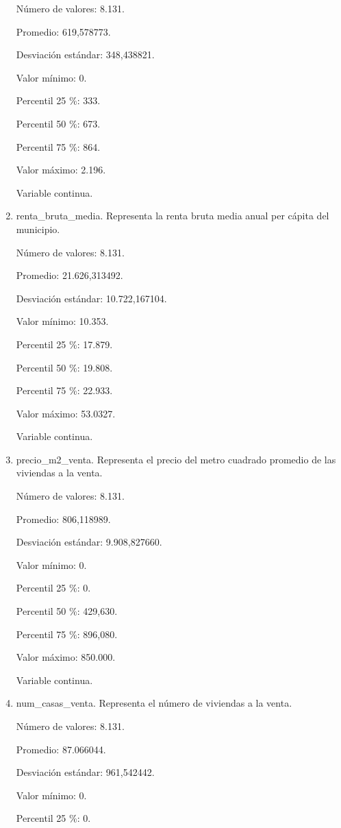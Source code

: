 \begin{enumerate}
	Número de valores: 8.131.
	
	Promedio: 619,578773.
	
	Desviación estándar: 348,438821.
	
	Valor mínimo: 0.
	
	Percentil 25 \%: 333.
	
	Percentil 50 \%: 673.
	
	Percentil 75 \%: 864.
	
	Valor máximo: 2.196.
	
	Variable continua.

	\item renta\_bruta\_media. Representa la renta bruta media anual per cápita del municipio.
	
	Número de valores: 8.131.
	
	Promedio: 21.626,313492.
	
	Desviación estándar: 10.722,167104.
	
	Valor mínimo: 10.353.
	
	Percentil 25 \%: 17.879.
	
	Percentil 50 \%: 19.808.
	
	Percentil 75 \%: 22.933.
	
	Valor máximo: 53.0327.
	
	Variable continua.

	\item precio\_m2\_venta. Representa el precio del metro cuadrado promedio de las viviendas a la venta.
	
	Número de valores: 8.131.
	
	Promedio: 806,118989.
	
	Desviación estándar: 9.908,827660.
	
	Valor mínimo: 0.
	
	Percentil 25 \%: 0.
	
	Percentil 50 \%: 429,630.
	
	Percentil 75 \%: 896,080.
	
	Valor máximo: 850.000.
	
	Variable continua.

	\item num\_casas\_venta. Representa el número de viviendas a la venta.
	
	Número de valores: 8.131.
	
	Promedio: 87.066044.
	
	Desviación estándar: 961,542442.
	
	Valor mínimo: 0.
	
	Percentil 25 \%: 0.
	

\end{enumerate}

